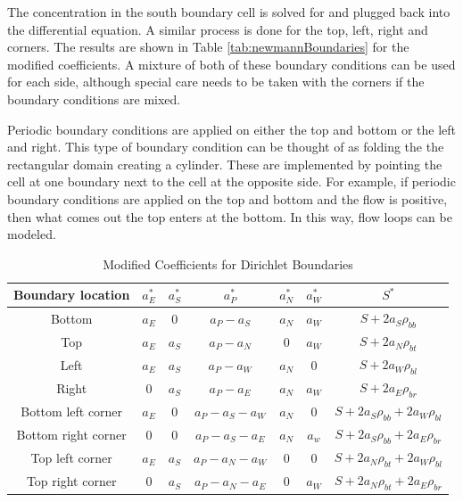 \noindent The concentration in the south boundary cell is solved for and plugged back into the differential equation. A similar process is done for the top, left, right and corners. The results are shown in Table \ref{tab:newmannBoundaries} for the modified coefficients. A mixture of both of these boundary conditions can be used for each side, although special care needs to be taken with the corners if the boundary conditions are mixed. 

Periodic boundary conditions are applied on either the top and bottom or the left and right. This type of boundary condition can be thought of as folding the the rectangular domain creating a cylinder. These are implemented by pointing the cell at one boundary next to the cell at the opposite side. For example, if periodic boundary conditions are applied on the top and bottom and the flow is positive, then what comes out the top enters at the bottom. In this way, flow loops can be modeled.

\begin{table}[h]
    \caption{\label{tab:dirichletBoundaries} Modified Coefficients for Dirichlet Boundaries}
    \centering
    \begin{tabular}{c|c|c|c|c|c|c}
    \hline
    \textbf{Boundary location} & \textbf{$a_{E}^{*}$} & \textbf{$a_{S}^{*}$} & \textbf{$a_{P}^{*}$} & \textbf{$a_{N}^{*}$} & \textbf{$a_{W}^{*}$} & \textbf{$S^{*}$} \\ [0.5ex]
    \hline
    \hline
    Bottom & $a_{E}$ & $0$ & $a_{P} - a_{S}$ & $a_{N}$ & $a_{W}$ & $S + 2a_{S}\rho_{bb}$\\ \hline
    Top & $a_{E}$ & $a_{S}$ & $a_{P} - a_{N}$ & $0$ & $a_{W}$ & $S + 2a_{N}\rho_{bt}$ \\ \hline 
    Left & $a_{E}$ & $a_{S}$ & $a_{P} - a_{W}$ & $a_{N}$ & $0$ & $S + 2a_{W}\rho_{bl}$  \\ \hline
    Right & $0$ & $a_{S}$ & $a_{P} - a_{E}$ & $a_{N}$ & $a_{W}$ & $S + 2a_{E}\rho_{br}$  \\ \hline
    Bottom left corner & $a_{E}$ & $0$ & $a_{P} - a_{S} - a_{W}$ & $a_{N}$ & $0$ & $S + 2a_{S}\rho_{bb} + 2a_{W}\rho_{bl}$ \\ \hline
    Bottom right corner & $0$ & $0$ & $a_{P} - a_{S} - a_{E}$ & $a_{N}$ & $a_{w}$ & $S + 2a_{S}\rho_{bb} + 2a_{E}\rho_{br}$ \\ \hline
    Top left corner & $a_{E}$ & $a_{S}$ & $a_{P} - a_{N} - a_{W}$ & $0$ & $0$ & $S + 2a_{N}\rho_{bt} + 2a_{W}\rho_{bl}$ \\ \hline
    Top right corner & $0$ & $a_{S}$ & $a_{P} - a_{N} - a_{E}$ & $0$ & $a_{W}$ & $S + 2a_{N}\rho_{bt} + 2a_{E}\rho_{br}$ \\ \hline
    \end{tabular}
\end{table}

